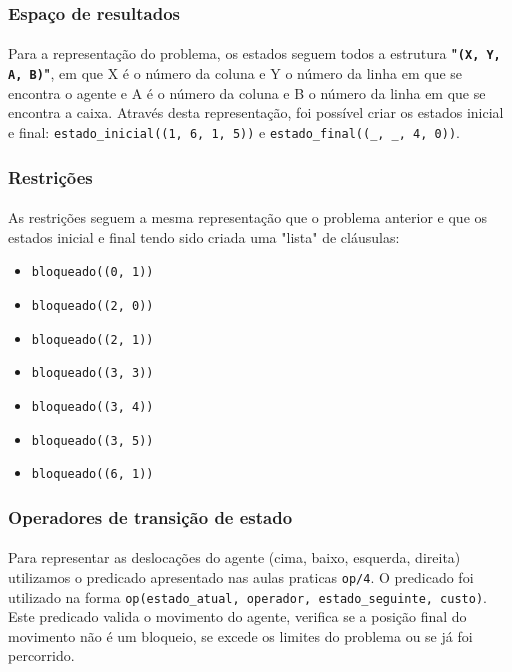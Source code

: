 \documentclass{article}
\begin{document}
\subsubsection{Espaço de resultados}
\paragraph{} Para a representação do problema, os estados seguem todos a estrutura \textbf{"\texttt{(X, Y, A, B)}"}, em que X é o número da coluna e Y o número da linha em que se encontra o agente e A é o número da coluna e B o número da linha em que se encontra a caixa. Através desta representação, foi possível criar os estados inicial e final: \texttt{estado\_inicial((1, 6, 1, 5))} e \texttt{estado\_final((\_, \_, 4, 0))}.

\subsubsection{Restrições}
\paragraph{} As restrições seguem a mesma representação que o problema anterior e que os estados inicial e final tendo sido criada uma "lista" de cláusulas:
\begin{itemize}
  \item \texttt{bloqueado((0, 1))}
  \item \texttt{bloqueado((2, 0))}
  \item \texttt{bloqueado((2, 1))}
  \item \texttt{bloqueado((3, 3))}
  \item \texttt{bloqueado((3, 4))}
  \item \texttt{bloqueado((3, 5))}
  \item \texttt{bloqueado((6, 1))}
\end{itemize}

\subsubsection{Operadores de transição de estado}
\paragraph{} Para representar as deslocações do agente (cima, baixo, esquerda, direita) utilizamos o predicado apresentado nas aulas praticas \texttt{op/4}. O predicado foi utilizado na forma \texttt{op(estado\_atual, operador, estado\_seguinte, custo)}. Este predicado valida o movimento do agente, verifica se a posição final do movimento não é um bloqueio, se excede os limites do problema ou se já foi percorrido.
\end{document}
